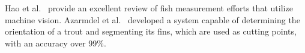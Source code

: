 \documentclass[screen,review]{acmart}
\begin{document}
Hao et al.~\cite{Hao2015TheMO} provide an excellent review of fish
measurement efforts that utilize machine vision.
Azarmdel et al.~\cite{Azarmdel2019DevelopingAO} developed a system
capable of determining the orientation of a trout and segmenting its fins,
which are used as cutting points, with an accuracy over 99\%.
\end{document}
